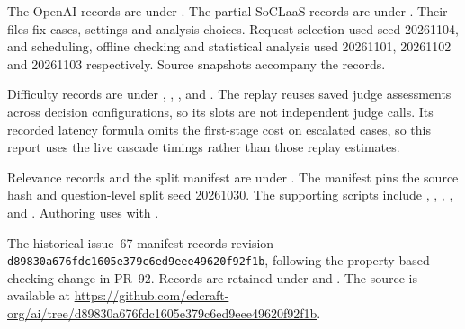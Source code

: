 The OpenAI records are under . The partial SoCLaaS records are under . Their  files fix cases, settings and analysis choices. Request selection used seed 20261104, and scheduling, offline checking and statistical analysis used 20261101, 20261102 and 20261103 respectively. Source snapshots accompany the records.

Difficulty records are under , , ,  and . The replay reuses saved judge assessments across decision configurations, so its slots are not independent judge calls. Its recorded latency formula omits the first-stage cost on escalated cases, so this report uses the live cascade timings rather than those replay estimates.

Relevance records and the split manifest are under . The manifest pins the source hash and question-level split seed 20261030. The supporting scripts include , , , ,  and . Authoring uses  with .

The historical issue~67 manifest records revision \nolinkurl{d89830a676fdc1605e379c6ed9eee49620f92f1b}, following the property-based checking change in PR~92. Records are retained under  and . The source is available at \url{https://github.com/edcraft-org/ai/tree/d89830a676fdc1605e379c6ed9eee49620f92f1b}.
